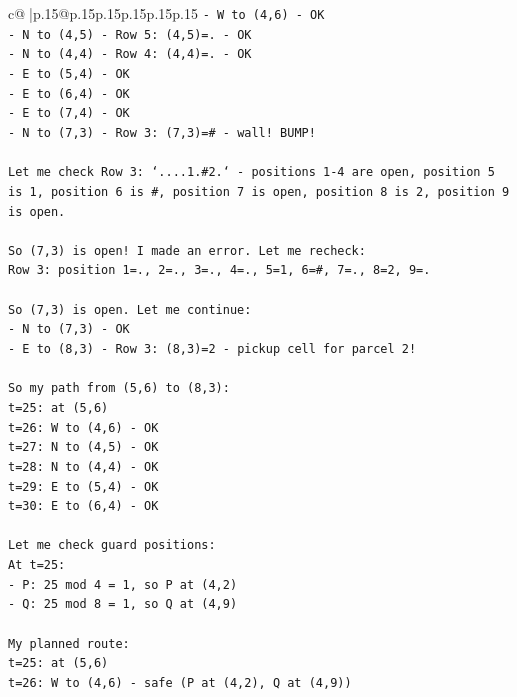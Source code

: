\documentclass{article}
\begin{document}
{\begin{supertabular}{c@{$\;$}|p{.15\linewidth}@{}p{.15\linewidth}p{.15\linewidth}p{.15\linewidth}p{.15\linewidth}p{.15\linewidth}}
{{{\texttt{{-} W to (4,6) {-} OK} \\
\texttt{{-} N to (4,5) {-} Row 5: (4,5)=. {-} OK} \\
\texttt{{-} N to (4,4) {-} Row 4: (4,4)=. {-} OK} \\
\texttt{{-} E to (5,4) {-} OK} \\
\texttt{{-} E to (6,4) {-} OK} \\
\texttt{{-} E to (7,4) {-} OK} \\
\texttt{{-} N to (7,3) {-} Row 3: (7,3)=\# {-} wall! BUMP!} \\
\\ 
\texttt{Let me check Row 3: `....1.\#2.` {-} positions 1{-}4 are open, position 5 is 1, position 6 is \#, position 7 is open, position 8 is 2, position 9 is open.} \\
\\ 
\texttt{So (7,3) is open! I made an error. Let me recheck:} \\
\texttt{Row 3: position 1=., 2=., 3=., 4=., 5=1, 6=\#, 7=., 8=2, 9=.} \\
\\ 
\texttt{So (7,3) is open. Let me continue:} \\
\texttt{{-} N to (7,3) {-} OK} \\
\texttt{{-} E to (8,3) {-} Row 3: (8,3)=2 {-} pickup cell for parcel 2!} \\
\\ 
\texttt{So my path from (5,6) to (8,3):} \\
\texttt{t=25: at (5,6)} \\
\texttt{t=26: W to (4,6) {-} OK} \\
\texttt{t=27: N to (4,5) {-} OK} \\
\texttt{t=28: N to (4,4) {-} OK} \\
\texttt{t=29: E to (5,4) {-} OK} \\
\texttt{t=30: E to (6,4) {-} OK} \\
\\ 
\texttt{Let me check guard positions:} \\
\texttt{At t=25:} \\
\texttt{{-} P: 25 mod 4 = 1, so P at (4,2)} \\
\texttt{{-} Q: 25 mod 8 = 1, so Q at (4,9)} \\
\\ 
\texttt{My planned route:} \\
\texttt{t=25: at (5,6)} \\
\texttt{t=26: W to (4,6) {-} safe (P at (4,2), Q at (4,9))} \\
}}}
\end{supertabular}}
\end{document}
